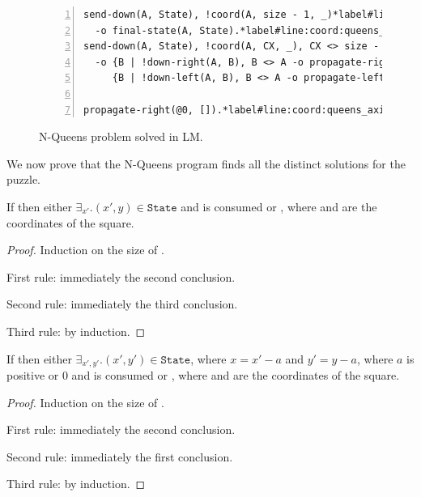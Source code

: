 \begin{figure}[h!]
\begin{Verbatim}[numbers=left,fontsize=\scriptsize,commandchars=\*\#\&]
send-down(A, State), !coord(A, size - 1, _)*label#line:coord:queens_complete1&*hfill// Rule 13: final state.
  -o final-state(A, State).*label#line:coord:queens_complete2&
send-down(A, State), !coord(A, CX, _), CX <> size - 1*label#line:coord:queens_down1&*hfill// Rule 14: propagate the state down.
  -o {B | !down-right(A, B), B <> A -o propagate-right(B, State)},
     {B | !down-left(A, B), B <> A -o propagate-left(B, State)}.*label#line:coord:queens_down2&

propagate-right(@0, []).*label#line:coord:queens_axiom&*hfill// Initial fact.
\end{Verbatim}
  \caption{N-Queens problem solved in LM.}
  \label{code:coordination:nqueens}
\end{figure}


We now prove that the N-Queens program finds all the distinct solutions for
the puzzle.

\begin{lemma}

If  then either $\exists_{x'}. {(x',
y) \in \mathtt{State}}$ and  is consumed or
, where
 and  are the coordinates of the square.

\end{lemma}
\begin{proof}
Induction on the size of .

First rule: immediately the second conclusion.

Second rule: immediately the third conclusion.

Third rule: by induction.
\end{proof}

\begin{lemma}
If  then either $\exists_{x', y'}. {(x', y') \in \mathtt{State}}$, where $x = x' - a$ and $y' = y - a$, where $a$ is positive or $0$ and  is consumed or , where  and  are the coordinates of the square.
\end{lemma}
\begin{proof}
Induction on the size of .

First rule: immediately the second conclusion.

Second rule: immediately the first conclusion.

Third rule: by induction.
\end{proof}

